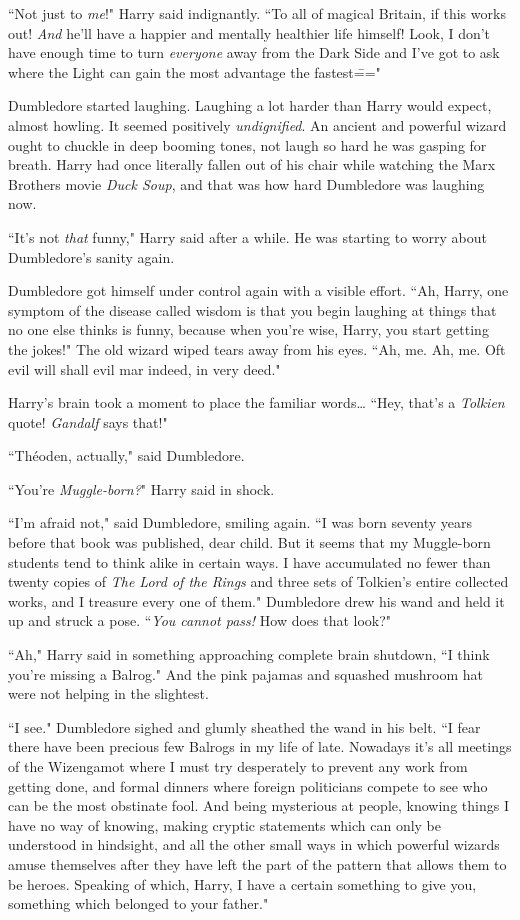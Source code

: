 ``Not just to \emph{me}!" Harry said indignantly. ``To all of magical Britain, if this works out! \emph{And} he'll have a happier and mentally healthier life himself! Look, I don't have enough time to turn \emph{everyone} away from the Dark Side and I've got to ask where the Light can gain the most advantage the fastest\==="

Dumbledore started laughing. Laughing a lot harder than Harry would expect, almost howling. It seemed positively \emph{undignified}. An ancient and powerful wizard ought to chuckle in deep booming tones, not laugh so hard he was gasping for breath. Harry had once literally fallen out of his chair while watching the Marx Brothers movie \emph{Duck Soup}, and that was how hard Dumbledore was laughing now.

``It's not \emph{that} funny," Harry said after a while. He was starting to worry about Dumbledore's sanity again.

Dumbledore got himself under control again with a visible effort. ``Ah, Harry, one symptom of the disease called wisdom is that you begin laughing at things that no one else thinks is funny, because when you're wise, Harry, you start getting the jokes!" The old wizard wiped tears away from his eyes. ``Ah, me. Ah, me. Oft evil will shall evil mar indeed, in very deed."

Harry's brain took a moment to place the familiar words{\ldots} ``Hey, that's a \emph{Tolkien} quote! \emph{Gandalf} says that!"

``Théoden, actually," said Dumbledore.

``You're \emph{Muggle-born?}" Harry said in shock.

``I'm afraid not," said Dumbledore, smiling again. ``I was born seventy years before that book was published, dear child. But it seems that my Muggle-born students tend to think alike in certain ways. I have accumulated no fewer than twenty copies of \emph{The Lord of the Rings} and three sets of Tolkien's entire collected works, and I treasure every one of them." Dumbledore drew his wand and held it up and struck a pose. ``\emph{You cannot pass!} How does that look?"

``Ah," Harry said in something approaching complete brain shutdown, ``I think you're missing a Balrog." And the pink pajamas and squashed mushroom hat were not helping in the slightest.

``I see." Dumbledore sighed and glumly sheathed the wand in his belt. ``I fear there have been precious few Balrogs in my life of late. Nowadays it's all meetings of the Wizengamot where I must try desperately to prevent any work from getting done, and formal dinners where foreign politicians compete to see who can be the most obstinate fool. And being mysterious at people, knowing things I have no way of knowing, making cryptic statements which can only be understood in hindsight, and all the other small ways in which powerful wizards amuse themselves after they have left the part of the pattern that allows them to be heroes. Speaking of which, Harry, I have a certain something to give you, something which belonged to your father."

